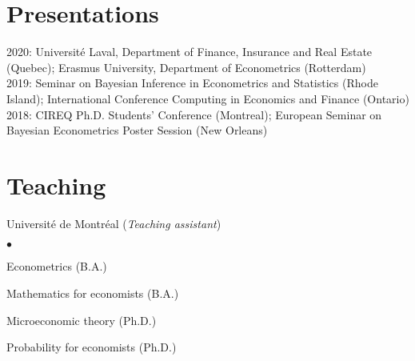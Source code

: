 \documentclass[margin,line]{res}
\newenvironment{list2}{
  \begin{list}{$\bullet$}{%
      \setlength{\itemsep}{0in}
      \setlength{\parsep}{0in} \setlength{\parskip}{0in}
      \setlength{\topsep}{0in} \setlength{\partopsep}{0in} 
      \setlength{\leftmargin}{0.17in}}}{\end{list}}
\begin{document}
\begin{resume}
\section{\sc Presentations}
2020: Universit\'e Laval, Department of Finance, Insurance and Real Estate (Quebec); Erasmus University, Department of Econometrics (Rotterdam) \vspace{0.1in} \\ 
2019: Seminar on Bayesian Inference in Econometrics and Statistics (Rhode Island); International Conference Computing in Economics and Finance (Ontario) \vspace{0.1in} \\ 
2018: CIREQ Ph.D. Students’ Conference (Montreal); European Seminar on Bayesian Econometrics Poster Session (New Orleans)

\section{\sc Teaching}
Universit\'e de Montr\'eal ({\em Teaching assistant})
\begin{list2}
   \item Econometrics (B.A.)
   \item Mathematics for economists (B.A.)
   \item Microeconomic theory (Ph.D.)
   \item Probability for economists (Ph.D.)  
 \end{list2}    



\end{resume}
\end{document}
